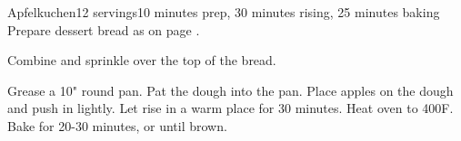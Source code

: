 \documentclass[../Cookbook.tex]{subfiles}
\begin{document}
\begin{recipe}[Apfelkuchen]{Apfelkuchen}{12 servings}{10 minutes prep, 30 minutes rising, 25 minutes baking}
	Prepare dessert bread as on page \pageref{BaseDessertBread}.

	Combine and sprinkle over the top of the bread.
	
	Grease a 10" round pan.
	Pat the dough into the pan.
	Place apples on the dough and push in lightly.
	Let rise in a warm place for 30 minutes.
	Heat oven to 400\0F.
	Bake for 20-30 minutes, or until brown.
\end{recipe}
\end{document}
